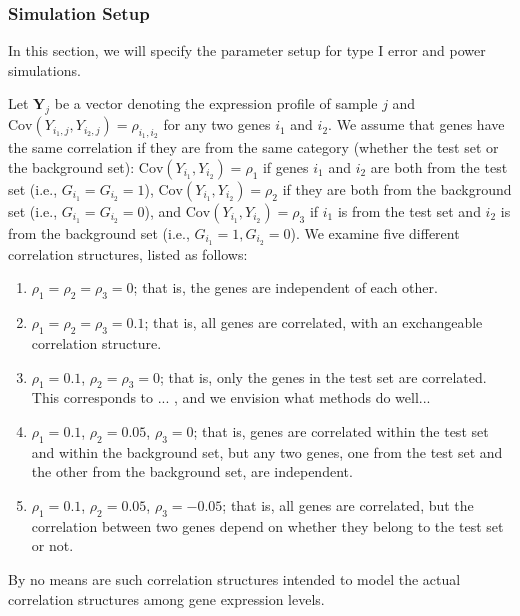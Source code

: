 \documentclass[a4,center,fleqn]{NAR}
\newcommand{\OurMethod}{MEQLEA}
\newcommand{\aaCase}{a}
\newcommand{\aCase}{c}
\newcommand{\cCase}{b}
\newcommand{\eCase}{d}
\newcommand{\fCase}{e}
\begin{document}
	\subsubsection{Simulation Setup}\label{subsection:simulation}
	In this section, we will specify the parameter setup for type I error and power simulations. %
	
	Let $\bm Y_{j}$ be a vector denoting the expression profile of sample $j$ and $\text{Cov}(Y_{i_1, j}, Y_{i_2, j})=\rho_{i_1,i_2}$ for any two genes $i_1$ and $i_2$. 
	We assume that genes have the same correlation if they are from the same category (whether the test set or the background set): $\text{Cov}(Y_{i_1}, Y_{i_2})= \rho_1$ if
	genes $i_1$ and $i_2$ are both from the test set (i.e., $G_{i_1} = G_{i_2}=1$), 
	$\text{Cov}(Y_{i_1}, Y_{i_2}) =\rho_2$ if they are both from the background set (i.e., $G_{i_1} =
	G_{i_2}=0$), and  $\text{Cov}(Y_{i_1}, Y_{i_2})= \rho_3$ if $i_1$ is from the test set and $i_2$ is
	from the background set (i.e., $G_{i_1} =1,  G_{i_2}=0$). We examine five different correlation
	structures, listed as follows:
	
	\begin{enumerate}
		\item[(\aaCase):] $\rho_1 = \rho_2 = \rho_3 = 0$; that is, the genes are independent of each
		other.
		\item[(\cCase):] $\rho_1 = \rho_2 = \rho_3 = 0.1$; that is, all genes are correlated, with an
		exchangeable correlation structure. 
		\item[(\aCase):] $\rho_1 = 0.1$, $\rho_2 = \rho_3 = 0$; that is, only the genes in the test set
		are correlated. This corresponds to ... , and we envision what methods do well...
		\item[(\eCase):] $\rho_1 = 0.1$, $\rho_2 = 0.05$, $\rho_3 = 0$; that is, 
		genes are correlated within the test set and within the background set, but any two genes, one
		from the test set and the other from the background set, are independent.
		\item[(\fCase):] $\rho_1 = 0.1$, $\rho_2 = 0.05$, $\rho_3 = -0.05$; that is, all genes are
		correlated, but the correlation between two genes depend on whether they belong to the test set or
		not.
	\end{enumerate}
	By no means are such correlation structures intended to model the actual correlation structures among gene expression levels.
	
\end{document}
